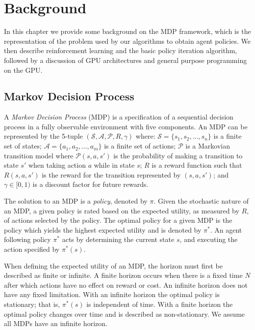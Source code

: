 \chapter{Background}
\label{chap:background}

In this chapter we provide some background on the MDP framework, which is the representation of the problem used by our algorithms to obtain agent policies. We then describe reinforcement learning and the basic policy iteration algorithm, followed by a discussion of GPU architectures and general purpose programming on the GPU.

\section{Markov Decision Process}

A \emph{Markov Decision Process} (MDP) \cite{norvig} is a specification of a sequential decision process in a fully observable environment with five components. An MDP can be represented by the 5-tuple $(\mathcal{S, A, P}, R, \gamma)$ where: $\mathcal{S} = \{s_1, s_2, ..., s_n\}$ is a finite set of states; $\mathcal{A} = \{a_1, a_2, ..., a_m\}$ is a finite set of actions; $\mathcal{P}$ is a Markovian transition model where $\mathcal{P}(s, a, s')$ is the probability of making a transition to state $s'$ when taking action $a$ while in state $s$; $R$ is a reward function such that $R(s, a, s')$ is the reward for the transition represented by $(s, a, s')$; and $\gamma \in [0, 1)$ is a discount factor for future rewards.

The solution to an MDP is a \emph{policy}, denoted by $\pi$. Given the stochastic nature of an MDP, a given policy is rated based on the expected utility, as measured by $R$, of actions selected by the policy. The optimal policy for a given MDP is the policy which yields the highest expected utility and is denoted by $\pi^*$. An agent following policy $\pi^*$ acts by determining the current state $s$, and executing the action specified by $\pi^*(s)$.

When defining the expected utility of an MDP, the horizon must first be described as finite or infinite. A finite horizon occurs when there is a fixed time $N$ after which actions have no effect on reward or cost. An infinite horizon does not have any fixed limitation. With an infinite horizon the optimal policy is stationary; that is, $\pi^*(s)$ is independent of time. With a finite horizon the optimal policy changes over time and is described as non-stationary. We assume all MDPs have an infinite horizon.

